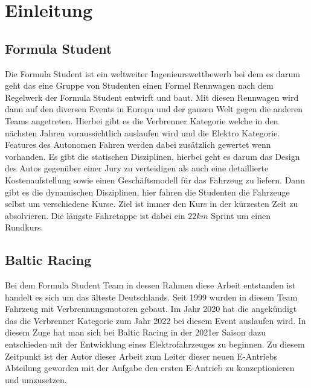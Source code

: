 


\chapter{Einleitung}

\section{Formula Student}
Die Formula Student ist ein weltweiter Ingenieurswettbewerb bei dem es darum geht das eine Gruppe von Studenten einen Formel Rennwagen nach dem Regelwerk der Formula Student entwirft und baut. Mit diesen Rennwagen wird dann auf den diversen Events in Europa und der ganzen Welt gegen die anderen Teams angetreten. Hierbei gibt es die Verbrenner Kategorie welche in den nächsten Jahren voraussichtlich auslaufen wird und die Elektro Kategorie. Features des Autonomen Fahren werden dabei zusätzlich gewertet wenn vorhanden. Es gibt die statischen Disziplinen, hierbei geht es darum das Design des Autos gegenüber einer Jury zu verteidigen als auch eine detaillierte Kostenaufstellung sowie einen Geschäftsmodell für das Fahrzeug zu liefern. Dann gibt es die dynamischen Disziplinen, hier fahren die Studenten die Fahrzeuge selbst um verschiedene Kurse. Ziel ist immer den Kurs in der kürzesten Zeit zu absolvieren. Die längste Fahretappe ist dabei ein \ensuremath{22 km} Sprint um einen Rundkurs.

\section{Baltic Racing}
Bei dem Formula Student Team in dessen Rahmen diese Arbeit entstanden ist handelt es sich um das älteste Deutschlands. Seit 1999 wurden in diesem Team Fahrzeug mit Verbrennungsmotoren gebaut. Im Jahr 2020 hat die  angekündigt das die Verbrenner Kategorie zum Jahr 2022 bei diesem Event auslaufen wird. In diesem Zuge hat man sich bei Baltic Racing in der 2021er Saison dazu entschieden mit der Entwicklung eines Elektrofahrzeuges zu beginnen. Zu diesem Zeitpunkt ist der Autor dieser Arbeit zum Leiter dieser neuen E-Antriebs Abteilung geworden mit der Aufgabe den ersten E-Antrieb zu konzeptionieren und umzusetzen.

